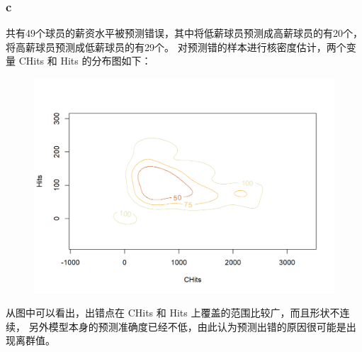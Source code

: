 \documentclass[12pt,a4paper]{article}
\begin{document}
    \subsubsection*{c}
    共有49个球员的薪资水平被预测错误，其中将低薪球员预测成高薪球员的有20个，将高薪球员预测成低薪球员的有29个。
    对预测错的样本进行核密度估计，两个变量 CHits 和 Hits 的分布图如下：
    \begin{figure}[H]
        \centering
        \includegraphics[scale=0.65]{Kernel.png}
    \end{figure}
    从图中可以看出，出错点在 CHits 和 Hits 上覆盖的范围比较广，而且形状不连续，
    另外模型本身的预测准确度已经不低，由此认为预测出错的原因很可能是出现离群值。
\end{document}
